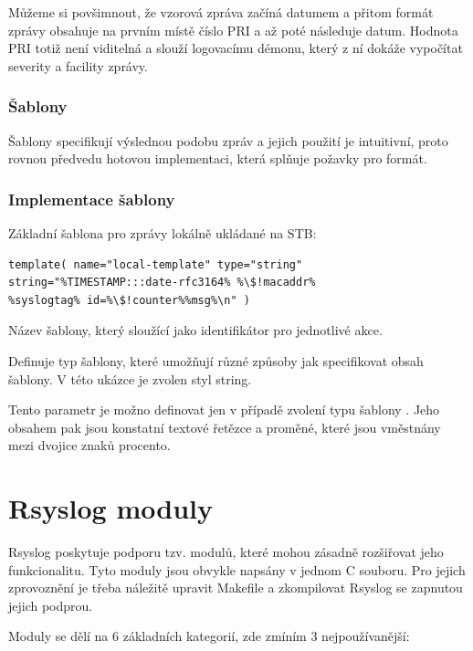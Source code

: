\documentclass[thesis=B,czech]{FITthesis}[2012/06/26]
\begin{document}
Můžeme si povšimnout, že vzorová zpráva začíná datumem a přitom formát zprávy obsahuje na prvním místě číslo PRI a až poté následuje datum. Hodnota PRI totiž není viditelná a slouží logovacímu démonu, který z ní dokáže vypočítat severity a facility zprávy.

\subsubsection{Šablony}
Šablony specifikují výslednou podobu zpráv a jejich použití je intuitivní, proto rovnou předvedu hotovou implementaci, která splňuje požavky pro formát.

\subsubsection*{Implementace šablony}
Základní šablona pro zprávy lokálně ukládané na STB:
\begin{lstlisting}
template( name="local-template" type="string"
string="%TIMESTAMP:::date-rfc3164% %\$!macaddr%
%syslogtag% id=%\$!counter%%msg%\n" )
\end{lstlisting}

\begin{description}
  \setlength\itemsep{-1ex}
  \item [name:] Název šablony, který sloužící jako identifikátor pro jednotlivé akce.
  \item [type:] Definuje typ šablony, které umožňují různé způsoby jak specifikovat obsah šablony. V této ukázce je zvolen styl string.
  \item [string:] Tento parametr je možno definovat jen v případě zvolení typu šablony . Jeho obsahem pak jsou konstatní textové řetězce a proměné, které jsou vměstnány mezi dvojice znaků procento.
\end{description}

\section{Rsyslog moduly}
Rsyslog poskytuje podporu tzv. modulů, které mohou zásadně rozšiřovat jeho funkcionalitu. Tyto moduly jsou obvykle napsány v jednom C souboru. Pro jejich zprovoznění je třeba náležitě upravit Makefile a zkompilovat Rsyslog se zapnutou jejich podprou.

Moduly se dělí na 6 základních kategorií, zde zmíním 3 nejpoužívanější:
\end{document}
